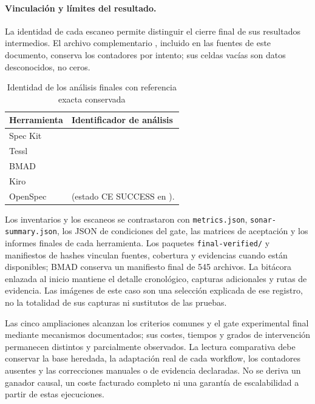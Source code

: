 \paragraph{Vinculación y límites del resultado.}

La identidad de cada escaneo permite distinguir el cierre final de sus resultados intermedios. El archivo complementario , incluido en las fuentes de este documento, conserva los contadores por intento; sus celdas vacías son datos desconocidos, no ceros.

\begin{table}[H]\centering\small\setlength{\tabcolsep}{4pt}\renewcommand{\arraystretch}{1.06}
\caption{Identidad de los análisis finales con referencia exacta conservada}
\label{tab:identidad_tetris_e2}
\begin{tabularx}{\textwidth}{l Y}\toprule

\textbf{Herramienta} & \textbf{Identificador de análisis} \\ \midrule

Spec Kit &  \\

Tessl &  \\

BMAD &  \\

Kiro &  \\

OpenSpec &  (estado CE SUCCESS en ). \\

\bottomrule\end{tabularx}

\end{table}

Los inventarios y los escaneos se contrastaron con \texttt{metrics.json}, \texttt{sonar-summary.json}, los JSON de condiciones del gate, las matrices de aceptación y los informes finales de cada herramienta. Los paquetes \texttt{final-verified/} y manifiestos de hashes vinculan fuentes, cobertura y evidencias cuando están disponibles; BMAD conserva un manifiesto final de 545 archivos. La bitácora enlazada al inicio mantiene el detalle cronológico, capturas adicionales y rutas de evidencia. Las imágenes de este caso son una selección explicada de ese registro, no la totalidad de sus capturas ni sustitutos de las pruebas.

Las cinco ampliaciones alcanzan los criterios comunes y el gate experimental final mediante mecanismos documentados; sus costes, tiempos y grados de intervención permanecen distintos y parcialmente observados. La lectura comparativa debe conservar la base heredada, la adaptación real de cada workflow, los contadores ausentes y las correcciones manuales o de evidencia declaradas. No se deriva un ganador causal, un coste facturado completo ni una garantía de escalabilidad a partir de estas ejecuciones.
